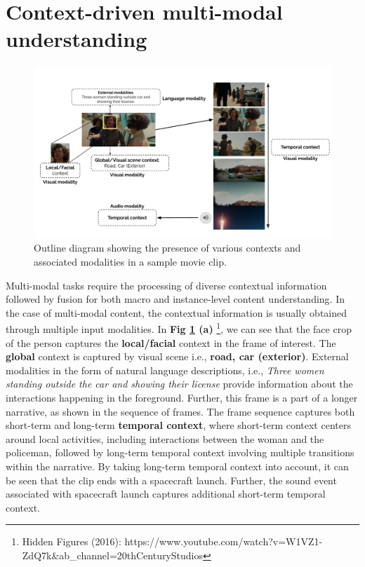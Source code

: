 \section{Context-driven multi-modal understanding}

\begin{figure}[h!]
    \centering
        \includegraphics[width=0.9\linewidth]{figures/context_diagram.pdf}
        \caption{Outline diagram showing the presence of various contexts and associated modalities in a sample movie clip.} 
        \label{contextmultimodal}
\end{figure}


Multi-modal tasks require the processing of diverse contextual information followed by fusion for both macro and instance-level content understanding. In the case of multi-modal content, the contextual information is usually obtained through multiple input modalities. In \textbf{Fig \ref{contextmultimodal} (a)} \footnote{Hidden Figures (2016): https://www.youtube.com/watch?v=W1VZ1-ZdQ7k\&ab\_channel=20thCenturyStudios}, we can see that the face crop of the person captures the \textbf{local/facial} context in the frame of interest. The \textbf{global} context is captured by visual scene i.e., \textbf{road, car (exterior)}. External modalities in the form of natural language descriptions, i.e., \textit{Three women standing outside the car and showing their license} provide information about the interactions happening in the foreground. Further, this frame is a part of a longer narrative, as shown in the sequence of frames. The frame sequence captures both short-term and long-term \textbf{temporal context}, where short-term context centers around local activities, including interactions between the woman and the policeman, followed by long-term temporal context involving multiple transitions within the narrative. By taking long-term temporal context into account, it can be seen that the clip ends with a spacecraft launch. Further, the sound event associated with spacecraft launch captures additional short-term temporal context.



